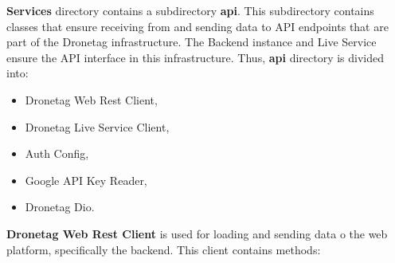 \textbf{Services} directory contains a subdirectory \textbf{api}.
This subdirectory contains classes that ensure receiving from and sending data to API endpoints that are part of the Dronetag infrastructure.
The Backend instance and Live Service ensure the API interface in this infrastructure.
Thus, \textbf{api} directory is divided into:
\begin{itemize}
    \item Dronetag Web Rest Client,
    \item Dronetag Live Service Client,
    \item Auth Config,
    \item Google API Key Reader,
    \item Dronetag Dio.
\end{itemize}
\textbf{Dronetag Web Rest Client} is used for loading and sending data o the web platform, specifically the backend.
This client contains methods:
